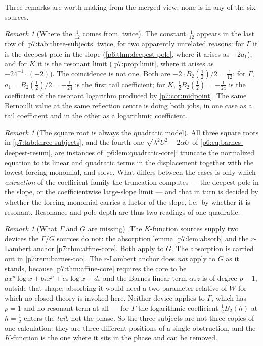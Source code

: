 \documentclass[11pt,a4paper,oneside]{book}
\theoremstyle{plain}
\theoremstyle{definition}
\theoremstyle{remark}
\newtheorem{remark}[theorem]{Remark}
\newcommand{\Wlam}{W}
\begin{document}
Three remarks are worth making from the merged view; none is in any of the six
sources.

\begin{remark}[Where the $\tfrac1{12}$ comes from, twice]
\label{p7:rem:same-twelfth}
The constant $\tfrac1{12}$ appears in the last row of
\cref{p7:tab:three-subjects} twice, for two apparently unrelated reasons: for
$\Gamma$ it is the deepest pole in the slope
(\cref{p6:thm:deepest-pole}, where it arises as $-2a_1$), and for $K$ it is
the resonant limit (\cref{p7:prop:limit}, where it arises as $-24^{-1}\cdot
(-2)$).  The coincidence is not one.  Both are $-2\cdot B_2(\tfrac12)/2
=\tfrac1{12}$: for $\Gamma$, $a_1=B_2(\tfrac12)/2=-\tfrac1{24}$ is the first
tail coefficient; for $K$, $\tfrac12B_2(\tfrac12)=-\tfrac1{24}$ is the
coefficient of the resonant logarithm produced by
\cref{p7:cor:midpoint}.  The same Bernoulli value at the same reflection
centre is doing both jobs, in one case as a tail coefficient and in the other
as a logarithmic coefficient.
\end{remark}

\begin{remark}[The square root is always the quadratic model]
\label{p7:rem:quadratic-again}
All three square roots in \cref{p7:tab:three-subjects}, and the fourth one
$\sqrt{\lambda^{2}U^{2}-2\alpha U}$ of \eqref{p6:eq:barnes-deepest-resum}, are
instances of \cref{p6:lem:quadratic-core}: truncate the normalized equation
to its linear and quadratic terms in the displacement together with the lowest
forcing monomial, and solve.  What differs between the cases is only which
\emph{extraction} of the coefficient family the truncation computes --- the
deepest pole in the slope, or the coefficientwise large-slope limit --- and
that in turn is decided by whether the forcing monomial carries a factor of
the slope, i.e.\ by whether it is resonant.  Resonance and pole depth are thus
two readings of one quadratic.
\end{remark}

\begin{remark}[What $\Gamma$ and $G$ are missing]\label{p7:rem:missing}
The $K$-function sources supply two devices the $\Gamma$/$G$ sources do not:
the absorption lemma \cref{p7:lem:absorb} and the $r$-Lambert anchor
\cref{p7:thm:affine-core}.  Both apply to $G$.  The absorption is carried out
in \cref{p7:rem:barnes-too}.  The $r$-Lambert anchor does \emph{not} apply to
$G$ as it stands, because \cref{p7:thm:affine-core} requires the core to be
$ax^{p}\log x+b_{*}x^{p}+c_{*}\log x+d_{*}$ and the Barnes linear term
$\alpha_{\!*}z$ is of degree $p-1$, outside that shape; absorbing it would
need a two-parameter relative of $\Wlam$ for which no closed theory is
invoked here.  Neither device applies to $\Gamma$, which has $p=1$ and no
resonant term at all --- for $\Gamma$ the logarithmic coefficient
$\tfrac12B_2(h)$ at $h=\tfrac12$ enters the \emph{tail}, not the phase.  So
the three subjects are not three copies of one calculation: they are three
different positions of a single obstruction, and the $K$-function is the one
where it sits in the phase and can be removed.
\end{remark}
\end{document}
